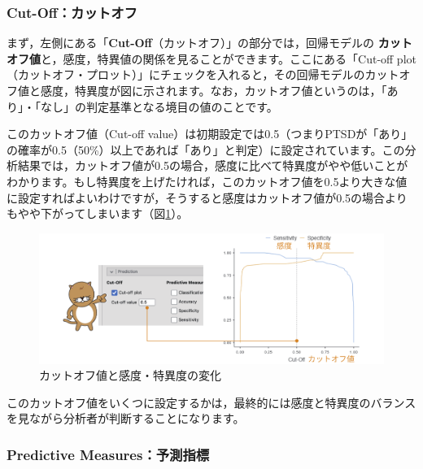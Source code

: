 \documentclass[
  12pt,
  a5jpaper,
  lualatex, ja=standard]{bxjsbook}
\renewcommand{\emph}[1]{\textbf{\color{emph} #1}}
\begin{document}
\hypertarget{cut-offux30abux30c3ux30c8ux30aaux30d5}{%
\subsubsection*{Cut-Off：カットオフ}\label{cut-offux30abux30c3ux30c8ux30aaux30d5}}

まず，左側にある「\textbf{Cut-Off}（カットオフ）」の部分では，回帰モデルの\emph{カットオフ値}と，感度，特異値の関係を見ることができます。ここにある「Cut-off plot（カットオフ・プロット）」にチェックを入れると，その回帰モデルのカットオフ値と感度，特異度が図に示されます。なお，カットオフ値というのは，「あり」・「なし」の判定基準となる境目の値のことです。

このカットオフ値（Cut-off value）は初期設定では0.5（つまりPTSDが「あり」の確率が0.5（50\%）以上であれば「あり」と判定）に設定されています。この分析結果では，カットオフ値が0.5の場合，感度に比べて特異度がやや低いことがわかります。もし特異度を上げたければ，このカットオフ値を0.5より大きな値に設定すればよいわけですが，そうすると感度はカットオフ値が0.5の場合よりもやや下がってしまいます（図\ref{fig:regression-binomial-cutoff}）。

\begin{figure}[!ht]

{\centering \includegraphics[width=1\linewidth]{images/regression/binomial-cutoff} 

}

\caption{カットオフ値と感度・特異度の変化}\label{fig:regression-binomial-cutoff}
\end{figure}

このカットオフ値をいくつに設定するかは，最終的には感度と特異度のバランスを見ながら分析者が判断することになります。

\hypertarget{predictive-measuresux4e88ux6e2cux6307ux6a19}{%
\subsubsection*{Predictive Measures：予測指標}\label{predictive-measuresux4e88ux6e2cux6307ux6a19}}
\end{document}
